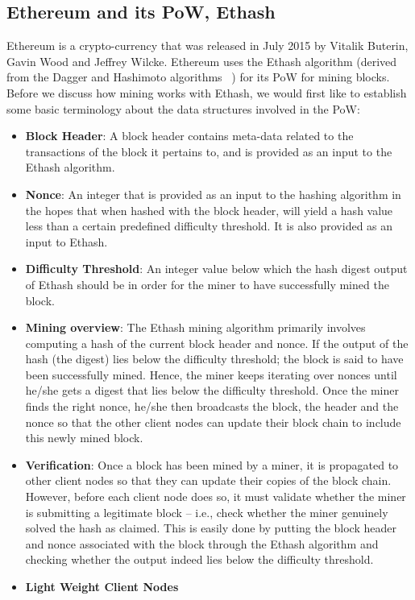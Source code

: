 \documentclass[runningheads]{llncs}
\begin{document}
\subsection{Ethereum and its PoW, Ethash}
Ethereum is a crypto-currency that was released in July 2015 by Vitalik Buterin, Gavin Wood and Jeffrey Wilcke. Ethereum uses the Ethash algorithm (derived from the Dagger and Hashimoto algorithms ~\cite{dagger-hashimoto}) for its PoW for mining blocks. Before we discuss how mining works with Ethash, we would first like to establish some basic terminology about the data structures involved in the PoW:
\begin{itemize}
\item \textbf{Block Header}: A block header contains meta-data related to the transactions of the block it pertains to, and is provided as an input to the Ethash algorithm.
\item \textbf{Nonce}: An integer that is provided as an input to the hashing algorithm in the hopes that when hashed with the block header, will yield a hash value less than a certain predefined difficulty threshold. It is also provided as an input to Ethash.
\item \textbf{Difficulty Threshold}: An integer value below which the hash digest output of Ethash should be in order for the miner to have successfully mined the block.
\item \textbf{Mining overview}: The Ethash mining algorithm primarily involves computing a hash of the current block header and nonce. If the output of the hash (the digest) lies below the difficulty threshold; the block is said to have been successfully mined. Hence, the miner keeps iterating over nonces until he/she gets a digest that lies below the difficulty threshold. Once the miner finds the right nonce, he/she then broadcasts the block, the header and the nonce so that the other client nodes can update their block chain to include this newly mined block. 
\item \textbf{Verification}: Once a block has been mined by a miner, it is propagated to other client nodes so that they can update their copies of the block chain. However, before each client node does so, it must validate whether the miner is submitting a legitimate block -- i.e., check whether the miner genuinely solved the hash as claimed. This is easily done by putting the block header and nonce associated with the block through the Ethash algorithm and checking whether the output indeed lies below the difficulty threshold. 
\item \textbf{Light Weight Client Nodes}

\end{itemize}
\end{document}
